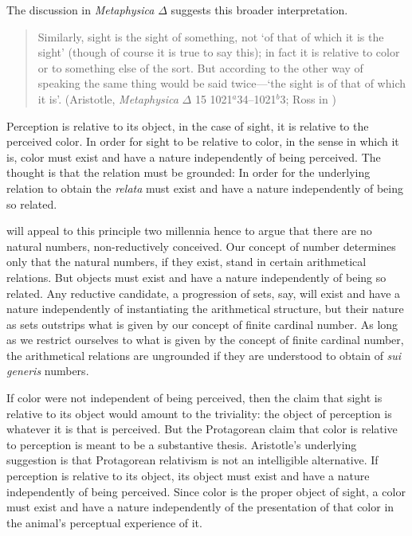 The discussion in \emph{Metaphysica} \( \Delta \) suggests this broader interpretation.
\begin{quote}
	Similarly, sight is the sight of something, not `of that of which it is the sight' (though of course it is true to say this); in fact it is relative to color or to something else of the sort. But according to the other way of speaking the same thing would be said twice---`the sight is of that of which it is'. (Aristotle, \emph{Metaphysica} \( \Delta \) 15 1021\( ^{a} \)34--1021\( ^{b} \)3; Ross in \citealt[76]{Barnes:1984kx})
\end{quote}
Perception is relative to its object, in the case of sight, it is relative to the perceived color. In order for sight to be relative to color, in the sense in which it is, color must exist and have a nature independently of being perceived. The thought is that the relation must be grounded: In order for the underlying relation to obtain the \emph{relata} must exist and have a nature independently of being so related. 

\citet{Benacerraf:1965sh} will appeal to this principle two millennia hence to argue that there are no natural numbers, non-reductively conceived. Our concept of number determines only that the natural numbers, if they exist, stand in certain arithmetical relations. But objects must exist and have a nature independently of being so related. Any reductive candidate, a progression of sets, say, will exist and have a nature independently of instantiating the arithmetical structure, but their nature as sets outstrips what is given by our concept of finite cardinal number. As long as we restrict ourselves to what is given by the concept of finite cardinal number, the arithmetical relations are ungrounded if they are understood to obtain of \emph{sui generis} numbers.

If color were not independent of being perceived, then the claim that sight is relative to its object would amount to the triviality: the object of perception is whatever it is that is perceived. But the Protagorean claim that color is relative to perception is meant to be a substantive thesis. Aristotle's underlying suggestion is that Protagorean relativism is not an intelligible alternative. If perception is relative to its object, its object must exist and have a nature independently of being perceived. Since color is the proper object of sight, a color must exist and have a nature independently of the presentation of that color in the animal's perceptual experience of it.

